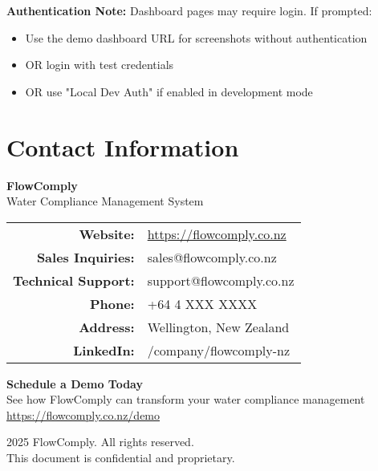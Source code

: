 \documentclass[11pt,a4paper]{article}
\begin{document}
\vspace{0.5cm}

\begin{highlightbox}
\textbf{Authentication Note:} Dashboard pages may require login. If prompted:
\begin{itemize}[itemsep=0.2em]
    \item Use the demo dashboard URL for screenshots without authentication
    \item OR login with test credentials
    \item OR use "Local Dev Auth" if enabled in development mode
\end{itemize}
\end{highlightbox}

\newpage

\section*{Contact Information}

\begin{center}
\Large
\textbf{\textcolor{primaryblue}{FlowComply}}\\[0.5cm]
\large
Water Compliance Management System\\[1cm]

\begin{tabular}{rl}
\textbf{Website:} & \url{https://flowcomply.co.nz} \\[0.3cm]
\textbf{Sales Inquiries:} & sales@flowcomply.co.nz \\[0.3cm]
\textbf{Technical Support:} & support@flowcomply.co.nz \\[0.3cm]
\textbf{Phone:} & +64 4 XXX XXXX \\[0.3cm]
\textbf{Address:} & Wellington, New Zealand \\[0.3cm]
\textbf{LinkedIn:} & /company/flowcomply-nz \\
\end{tabular}

\vspace{2cm}

\begin{highlightbox}
    \centering
    \textbf{Schedule a Demo Today}\\[0.5cm]
    See how FlowComply can transform your water compliance management\\[0.3cm]
    \url{https://flowcomply.co.nz/demo}
\end{highlightbox}

\end{center}

\vfill

\begin{center}
\footnotesize
\textcopyright{} 2025 FlowComply. All rights reserved.\\
This document is confidential and proprietary.
\end{center}
\end{document}
